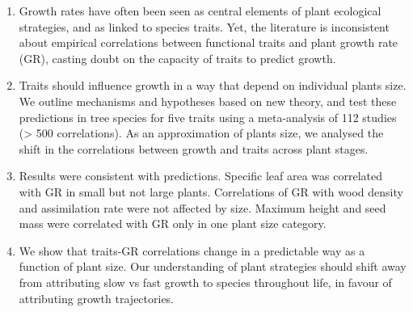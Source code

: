 \documentclass[a4paper]{article}\usepackage[]{graphicx}\usepackage[]{color}
\begin{document}
\begin{enumerate}

\item
Growth rates have often been seen as central elements of plant ecological strategies, and as linked to species traits. Yet, the literature is inconsistent about empirical correlations between functional traits and plant growth rate (GR), casting doubt on the capacity of traits to predict growth.

\item 
Traits should influence growth in a way that depend on individual plants size. We outline mechanisms and hypotheses based on new theory, and test these predictions in tree species for five traits using a meta-analysis of 112 studies (> 500 correlations). As an approximation of plants size, we analysed the shift in the correlations between growth and traits across plant stages.

\item
Results were consistent with predictions. Specific leaf area was correlated with GR in small but not large plants. Correlations of GR with wood density and assimilation rate were not affected by size. Maximum height and seed mass were correlated with GR only in one plant size category.

\item 
We show that traits-GR correlations change in a predictable way as a function of plant size. Our understanding of plant strategies should shift away from attributing slow vs fast growth to species throughout life, in favour of attributing growth trajectories.

 
\end{enumerate}
\end{document}
